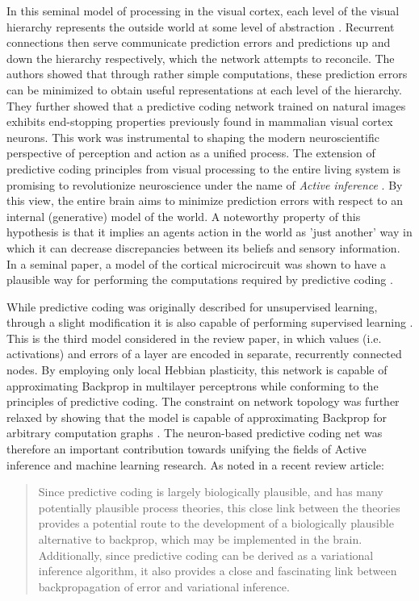 In this seminal model of processing in the visual cortex, each level of the visual hierarchy represents the outside
world at some level of abstraction . Recurrent connections then serve communicate prediction errors and predictions up
and down the hierarchy respectively, which the network attempts to reconcile. The authors showed that through rather
simple computations, these prediction errors can be minimized to obtain useful representations at each level of the
hierarchy. They further showed that a predictive coding network trained on natural images exhibits end-stopping
properties previously found in mammalian visual cortex neurons. This work was instrumental to shaping the modern
neuroscientific perspective of perception and action as a unified process. The extension of predictive coding principles
from visual processing to the entire living system is promising to revolutionize neuroscience under the name of
\textit{Active inference} \citep{Friston2008,Friston2009,Adams2015}. By this view, the entire brain aims to minimize
prediction errors with respect to an internal (generative) model of the world. A noteworthy property of this hypothesis
is that it implies an agents action in the world as 'just another' way in which it can decrease discrepancies between
its beliefs and sensory information. In a seminal paper, a model of the cortical microcircuit
\citep{haeusler2007statistical} was shown to have a plausible way for performing the computations required by predictive
coding \citep{bastos2012canonical}.

While predictive coding was originally described for unsupervised learning, through a slight modification it is also
capable of performing supervised learning \citep{Whittington2017}. This is the third model considered in the review
paper, in which values (i.e. activations) and errors of a layer are encoded in separate, recurrently connected nodes. By
employing only local Hebbian plasticity, this network is capable of approximating Backprop in multilayer perceptrons
while conforming to the principles of predictive coding. The constraint on network topology was further relaxed by
showing that the model is capable of approximating Backprop for arbitrary computation graphs \citep{Millidge2022}. The
neuron-based predictive coding net was therefore an important contribution towards unifying the fields of Active
inference and machine learning research. As noted in a recent review article:

\begin{quotation}
  Since predictive coding is largely biologically plausible, and has many potentially plausible process theories, this
  close link between the theories provides a potential route to the development of a biologically plausible alternative to
  backprop, which may be implemented in the brain. Additionally, since predictive coding can be derived as a variational
  inference algorithm, it also provides a close and fascinating link between backpropagation of error and variational
  inference. \citep{millidge2021predictive}
\end{quotation}

